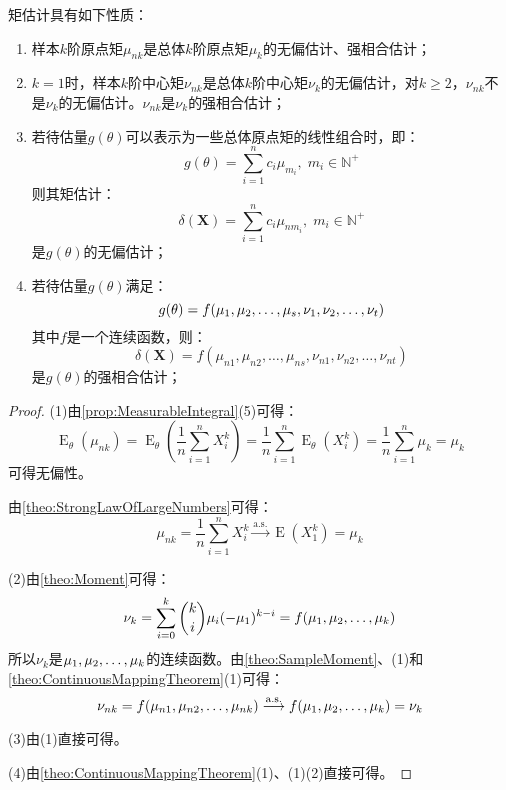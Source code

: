 \begin{property}\label{prop:MomentEstimation}
	矩估计具有如下性质：
	\begin{enumerate}
		\item 样本$k$阶原点矩$\mu_{nk}$是总体$k$阶原点矩$\mu_k$的无偏估计、强相合估计；
		\item $k=1$时，样本$k$阶中心矩$\nu_{nk}$是总体$k$阶中心矩$\nu_k$的无偏估计，对$k\geqslant2$，$\nu_{nk}$不是$\nu_k$的无偏估计。$\nu_{nk}$是$\nu_k$的强相合估计；
		\item 若待估量$g(\theta)$可以表示为一些总体原点矩的线性组合时，即：
		\begin{equation*}
			g(\theta)=\sum_{i=1}^{n}c_i\mu_{m_i},\;m_i\in\mathbb{N}^+
		\end{equation*}
		则其矩估计：
		\begin{equation*}
			\delta(\mathbf{X})=\sum_{i=1}^{n}c_i\mu_{nm_i},\;m_i\in\mathbb{N}^+
		\end{equation*}
		是$g(\theta)$的无偏估计；
		\item 若待估量$g(\theta)$满足：
		\begin{equation*}
			g(\theta)=f(\mu_1, \mu_2, \dots, \mu_{s},\nu_1, \nu_2, \dots, \nu_{t})
		\end{equation*}
		其中$f$是一个连续函数，则：
		\begin{equation*}
			\delta(\mathbf{X})=f(\mu_{n1},\mu_{n2},\dots,\mu_{ns},\nu_{n1},\nu_{n2},\dots,\nu_{nt})
		\end{equation*}
		是$g(\theta)$的强相合估计；
	\end{enumerate}
\end{property}
\begin{proof}
	(1)由\cref{prop:MeasurableIntegral}(5)可得：
	\begin{equation*}
		\operatorname{E}_{\theta}(\mu_{nk})=\operatorname{E}_{\theta}\left(\frac{1}{n}\sum_{i=1}^{n}X_i^k\right)=\frac{1}{n}\sum_{i=1}^{n}\operatorname{E}_{\theta}(X_i^k)=\frac{1}{n}\sum_{i=1}^{n}\mu_k=\mu_k
	\end{equation*}
	可得无偏性。\par
	由\cref{theo:StrongLawOfLargeNumbers}可得：
	\begin{equation*}
		\mu_{nk}=\frac{1}{n}\sum_{i=1}^{n}X_i^k\overset{\text{a.s.}}{\longrightarrow}\operatorname{E}(X_1^k)=\mu_k
	\end{equation*}\par
	(2)由\cref{theo:Moment}可得：
	\begin{equation*}
		\nu_k=\sum_{i=0}^{k}\binom{k}{i}\mu_i(-\mu_1)^{k-i}=f(\mu_1, \mu_2, \dots, \mu_{k})
	\end{equation*}
	所以$\nu_k$是$\mu_1, \mu_2, \dots, \mu_{k}$的连续函数。由\cref{theo:SampleMoment}、(1)和\cref{theo:ContinuousMappingTheorem}(1)可得：
	\begin{equation*}
		\nu_{nk}=f(\mu_{n1},\mu_{n2},\dots,\mu_{nk})\overset{\text{a.s.}}{\longrightarrow}f(\mu_1, \mu_2, \dots, \mu_{k})=\nu_{k}
	\end{equation*}\par
	(3)由(1)直接可得。\par
	(4)由\cref{theo:ContinuousMappingTheorem}(1)、(1)(2)直接可得。
\end{proof}